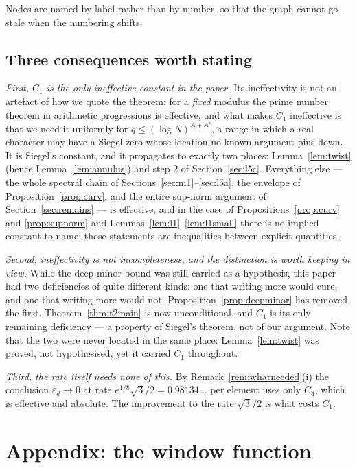 \documentclass[11pt,a4paper]{article}
\theoremstyle{plain}
\theoremstyle{definition}
\theoremstyle{remark}
\begin{document}
\noindent
Nodes are named by label rather than by number, so that the graph cannot go
stale when the numbering shifts.


\subsection{Three consequences worth stating}

\emph{First, $C_1$ is the only ineffective constant in the paper.} Its
ineffectivity is not an artefact of how we quote the theorem: for a
\emph{fixed} modulus the prime number theorem in arithmetic progressions is
effective, and what makes $C_1$ ineffective is that we need it uniformly for
$q\le(\log N)^{A+A'}$, a range in which a real character may have a Siegel
zero whose location no known argument pins down. It is Siegel's constant, and
it propagates to exactly two places: Lemma~\ref{lem:twist} (hence
Lemma~\ref{lem:annulus}) and step 2 of Section~\ref{sec:l5c}. Everything else
--- the whole spectral chain of Sections~\ref{sec:m1}--\ref{sec:l5a}, the
envelope of Proposition~\ref{prop:curv}, and the entire sup-norm argument of
Section~\ref{sec:remains} --- is effective, and in the case of
Propositions~\ref{prop:curv} and \ref{prop:supnorm} and
Lemmas~\ref{lem:l1}--\ref{lem:l1small} there is no implied constant to name:
those statements are inequalities between explicit quantities.

\emph{Second, ineffectivity is not incompleteness, and the distinction is
worth keeping in view.} While the deep-minor bound was still carried as a
hypothesis, this paper had two deficiencies of quite different kinds: one that
writing more would cure, and one that writing more would not.
Proposition~\ref{prop:deepminor} has removed the first.
Theorem~\ref{thm:t2main} is now unconditional, and $C_1$ is its only remaining
deficiency --- a property of Siegel's theorem, not of our argument. Note that
the two were never located in the same place: Lemma~\ref{lem:twist} was proved,
not hypothesised, yet it carried $C_1$ throughout.

\emph{Third, the rate itself needs none of this.} By
Remark~\ref{rem:whatneeded}(i) the conclusion $\varepsilon_d\to0$ at rate
$e^{1/8}\sqrt3/2=0.98134\ldots$ per element uses only $C_4$, which is effective
and absolute. The improvement to the rate $\sqrt3/2$ is what costs $C_1$.

\section{Appendix: the window function}\label{sec:window}
\end{document}
